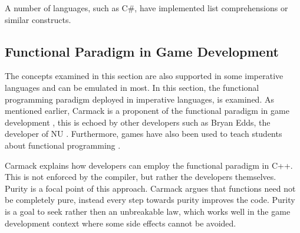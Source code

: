 A number of languages, such as C\#, have implemented list comprehensions or similar constructs. 

\subsection{Functional Paradigm in Game Development} \label{sec:functional-game-dev}
The concepts examined in this section are also supported in some imperative languages and can be emulated in most. In this section, the functional programming paradigm deployed in imperative languages, is examined. As mentioned earlier, Carmack is a proponent of the functional paradigm in game development \cite{gamasutra:c++functional}, this is echoed by other developers such as Bryan Edds, the developer of NU \cite{edds2016whyFunctional}. Furthermore, games have also been used to teach students about functional programming \cite{maggiore2009game}.

Carmack explains how developers can employ the functional paradigm in C++. This is not enforced by the compiler, but rather the developers themselves. Purity is a focal point of this approach. Carmack argues that functions need not be completely pure, instead every step towards purity improves the code. Purity is a goal to seek rather then an unbreakable law, which works well in the game development context where some side effects cannot be avoided.
